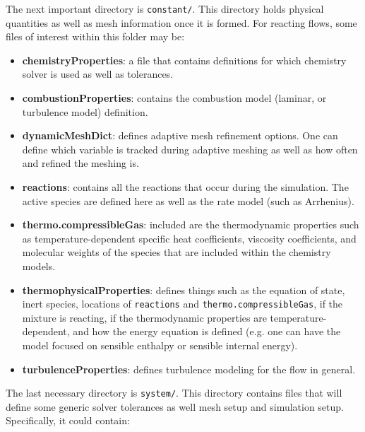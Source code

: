 The next important directory is \verb|constant/|. This directory holds physical quantities as well as mesh information once it is formed. For reacting flows, some files of interest within this folder may be:

\begin{itemize}
    \item \textbf{chemistryProperties}: a file that contains definitions for which chemistry solver is used as well as tolerances.
    \item \textbf{combustionProperties}: contains the combustion model (laminar, or turbulence model) definition.
    \item \textbf{dynamicMeshDict}: defines adaptive mesh refinement options. One can define which variable is tracked during adaptive meshing as well as how often and refined the meshing is. 
    \item \textbf{reactions}: contains all the reactions that occur during the simulation. The active species are defined here as well as the rate model (such as Arrhenius). 
    \item \textbf{thermo.compressibleGas}: included are the thermodynamic properties such as temperature-dependent specific heat coefficients, viscosity coefficients, and molecular weights of the species that are included within the chemistry models.
    \item \textbf{thermophysicalProperties}: defines things such as the equation of state, inert species, locations of \verb|reactions| and \verb|thermo.compressibleGas|, if the mixture is reacting, if the thermodynamic properties are temperature-dependent, and how the energy equation is defined (e.g. one can have the model focused on sensible enthalpy or sensible internal energy).
    \item \textbf{turbulenceProperties}: defines turbulence modeling for the flow in general. 
\end{itemize}

The last necessary directory is \verb|system/|. This directory contains files that will define some generic solver tolerances as well mesh setup and simulation setup. Specifically, it could contain:

